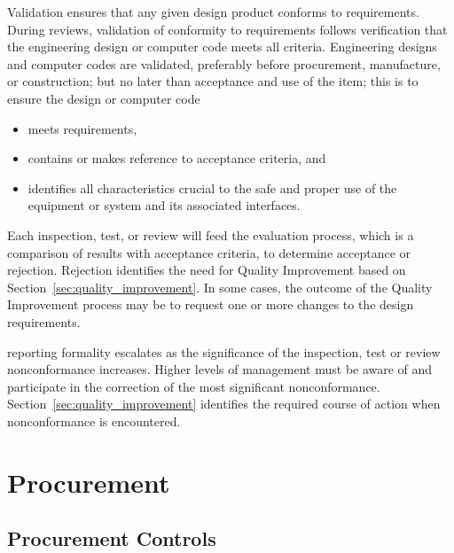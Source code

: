 Validation ensures that any given design product conforms to 
requirements.
During reviews, validation of conformity to requirements
follows verification that the engineering design or computer code
meets all criteria. Engineering designs and computer codes are
validated, preferably before procurement, manufacture, or
construction; but no later than acceptance and use of the item; this
is to ensure the design or computer code
\begin{itemize}
 \item meets  requirements,
 \item contains or makes reference to acceptance criteria, and
 \item identifies all characteristics crucial to the safe and proper
   use of the equipment or system and its associated interfaces.
\end{itemize}

Each inspection, test, or review will feed the  evaluation
process, which is a comparison of results with acceptance criteria, to
determine acceptance or rejection. Rejection identifies the need for
Quality Improvement based on Section~\ref{sec:quality_improvement}. In
some cases, the outcome of the Quality Improvement process may be to
request one or more changes to the design requirements.

 reporting formality escalates as the significance of the
inspection, test or review nonconformance increases. Higher levels of
management must be aware of and participate in the correction of the
most significant nonconformance. Section~\ref{sec:quality_improvement}
identifies the required course of action when nonconformance is
encountered.

\section{Procurement}

\subsection{Procurement Controls}

